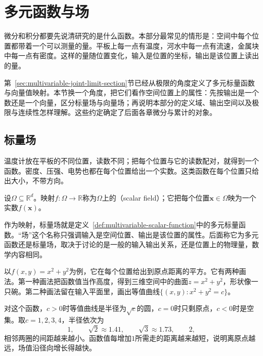 \par{}

\label{sec:analysis-multivariable-differentiation}
\label{sec:multivariable-differentiation}

\section{多元函数与场}
\label{sec:multivariable-functions-and-fields}

微分和积分都要先说清研究的是什么函数。本部分最常见的情形是：空间中每个位置都带着一个可以测量的量。平板上每一点有温度，河水中每一点有流速，金属块中每一点有密度。这样的量随位置变化，输入是位置的坐标，输出是该位置上读出的量。

第~\ref{sec:multivariable-joint-limit-section}节已经从极限的角度定义了多元标量函数与向量值映射。本节换一个角度，把它们看作空间位置上的属性：先按输出是一个数还是一个向量，区分标量场与向量场；再说明本部分的定义域、输出空间以及极限与连续性怎样理解。这些约定确定了后面各章微分与累计的对象。

\subsection{标量场}
\label{sec:multivariable-scalar-fields}

温度计放在平板的不同位置，读数不同；把每个位置与它的读数配对，就得到一个函数。密度、压强、电势也都在每个位置给出一个实数。这类函数在每个位置只给出大小，不带方向。
\begin{definition}[标量场]
\label{def:multivariable-scalar-field}
设$\Omega\subseteq\mathbb R^d$。映射$f:\Omega\to\mathbb R$称为$\Omega$上的（scalar field）；它把每个位置$\bm x\in\Omega$映为一个实数$f(\bm x)$。
\end{definition}
作为映射，标量场就是定义~\ref{def:multivariable-scalar-function}中的多元标量函数。“场”这个名称只强调输入是空间位置、输出是该位置的属性。后面称它为多元函数还是标量场，取决于讨论的是一般的输入输出关系，还是位置上的物理量，数学内容相同。

以$f(x,y)=x^2+y^2$为例，它在每个位置给出到原点距离的平方。它有两种画法。第一种画法把函数值当作高度，得到三维空间中的曲面$z=x^2+y^2$，形状像一只碗。第二种画法留在输入平面里，画出等值曲线$\{(x,y):x^2+y^2=c\}$。

对这个函数，$c>0$时等值曲线是半径为$\sqrt c$的圆，$c=0$时只剩原点，$c<0$时是空集。取$c=1,2,3,4$，半径依次为
\[
 1,\qquad\sqrt2\approx1.41,\qquad\sqrt3\approx1.73,\qquad2,
\]
相邻两圈的间距越来越小。函数值每增加$1$所需走的距离越来越短，说明离原点越远，场值沿径向增长得越快。

